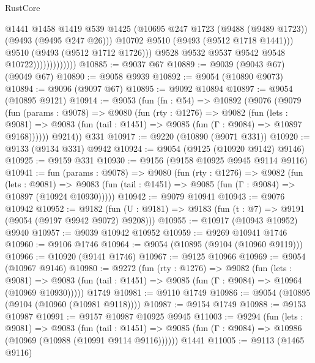 \begin{lexlean}{RustCore}
\begin{coremodule}
                                  @1441
                                  @1458
                                  @1419
                                  @539
                                  @1425
                                  (@10695 @247 @1723 (@9488 (@9489 @1723)) (@9493 (@9495 @247 @26)))
                                  @10702
                                  @9510
                                  (@9493 (@9512 @1718 @1441)))
                                @9510
                                (@9493 (@9512 @1712 @1726)))
                              @9528
                              @9532
                              @9537
                              @9542
                              @9548
                              @10722)))))))))))))
@10885 := @9037 @67
@10889 := @9039 (@9043 @67) (@9049 @67)
@10890 := @9058 @9939
@10892 := @9054 (@10890 @9073)
@10894 := @9096 (@9097 @67)
@10895 := @9092 @10894
@10897 := @9054 (@10895 @9121)
@10914 := @9053
    (fun (fn : @54) =>
    @10892
      (@9076
        (@9079
          (fun (params : @9078) =>
          @9080
            (fun (rty : @1276) =>
            @9082
              (fun (lets : @9081) =>
              @9083 (fun (tail : @1451) => @9085 (fun (Γ : @9084) => @10897 @9168))))))
        @9214))
    @331
@10917 := @9220 (@10890 (@9071 @331))
@10920 := @9133 (@9134 @331) @9942
@10924 := @9054 (@9125 (@10920 @9142) @9146)
@10925 := @9159 @331
@10930 := @9156 (@9158 @10925 @9945 @9114 @9116)
@10941 := fun (params : @9078) =>
  @9080
    (fun (rty : @1276) =>
    @9082
      (fun (lets : @9081) =>
      @9083 (fun (tail : @1451) => @9085 (fun (Γ : @9084) => @10897 (@10924 @10930)))))
@10942 := @9079 @10941
@10943 := @9076 @10942
@10952 := @9182 (fun (U : @9181) => @9183 (fun (t : @7) => @9191 (@9054 (@9197 @9942 @9072) @9208)))
@10955 := @10917 (@10943 @10952) @9940
@10957 := @9039 @10942 @10952
@10959 := @9269 @10941 @1746
@10960 := @9106 @1746
@10964 := @9054 (@10895 (@9104 (@10960 @9119)))
@10966 := @10920 (@9141 @1746)
@10967 := @9125 @10966
@10969 := @9054 (@10967 @9146)
@10980 := @9272
    (fun (rty : @1276) =>
    @9082
      (fun (lets : @9081) =>
      @9083 (fun (tail : @1451) => @9085 (fun (Γ : @9084) => @10964 (@10969 @10930)))))
    @1749
@10981 := @9110 @1749
@10986 := @9054 (@10895 (@9104 (@10960 (@10981 @9118))))
@10987 := @9154 @1749
@10988 := @9153 @10987
@10991 := @9157 @10987 @10925 @9945
@11003 := @9294
    (fun (lets : @9081) =>
    @9083
      (fun (tail : @1451) =>
      @9085 (fun (Γ : @9084) => @10986 (@10969 (@10988 (@10991 @9114 @9116))))))
    @1441
@11005 := @9113 (@1465 @9116)

\end{coremodule}
\end{lexlean}

